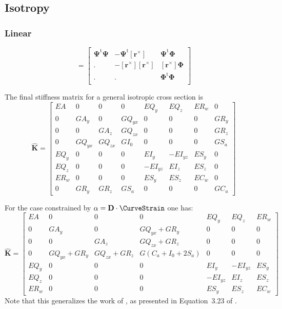 \subsection{Isotropy}
\subsubsection{Linear}

\begin{equation*}
=\begin{bmatrix}
\bm{\Psi}^{\mathrm{t}}\bm{\Psi} & -\bm{\Psi}^{\mathrm{t}}[\bm{r}^\times] & \bm{\Psi}^{\mathrm{t}}\bm{\Phi} \\
. & -\left[\bm{r}^{\times}\right][\bm{r}^\times] & \left[\bm{r}^{\times}\right]\bm{\Phi} \\
. & . & \bm{\Phi}^{\mathrm{t}}\bm{\Phi} \\
\end{bmatrix} 
\end{equation*}

The final stiffness matrix for a general isotropic cross section is
\begin{equation}
\hat{\mathbf{K}} = \left[\begin{array}{ccc|ccc|cc}
E A & 0 & 0 & 0 & E Q_{y} & E Q_{z} & E R_{w} & 0\\
0 & G A_{y} & 0 & G Q_{yx} & 0 & 0 & 0 & G R_{y}\\
0 & 0 & G A_{z} & G Q_{zx} & 0 & 0 & 0 & G R_{z}\\ \hline
0 & G Q_{yx} & G Q_{zx} & G I_{0} & 0 & 0 & 0 & G S_{a} \\
E Q_{y} & 0 & 0 & 0 & E I_{y} & - E I_{yz} & E S_{y} & 0 \\
E Q_{z} & 0 & 0 & 0 & - E I_{yz} & E I_{z} & E S_{z} & 0 \\ \hline
E R_{w} & 0 & 0 & 0 & E S_{y} & E S_{z} & E C_{w} & 0 \\
0 & G R_{y} & G R_{z} & G S_{a} & 0 & 0 & 0 & G C_{a}
\end{array}\right]
\end{equation}

For the case constrained by \(\alpha = \mathbf{D}\cdot \CurveStrain\) one has:
\begin{equation*}
\hat{\mathbf{K}} = \left[\begin{array}{ccc|ccc|c}
E A & 0 & 0 & 0 & E Q_{y} & E Q_{z} & E R_{w}\\
0 & G A_{y} & 0 & G Q_{yx} + G R_{y} & 0 & 0 & 0\\
0 & 0 & G A_{z} & G Q_{zx} + G R_{z} & 0 & 0 & 0\\ \hline
0 & G Q_{yx} + G R_{y} & G Q_{zx} + G R_{z} & G (C_{a} + I_{0} + 2 S_{a}) & 0 & 0 & 0\\
E Q_{y} & 0 & 0 & 0 & E I_{y} & - E I_{yz} & E S_{y}\\
E Q_{z} & 0 & 0 & 0 & - E I_{yz} & E I_{z} & E S_{z}\\ \hline
E R_{w} & 0 & 0 & 0 & E S_{y} & E S_{z} & E C_{w}
\end{array}\right]
\end{equation*}
Note that this generalizes the work of \cite{saritas2006mixed}, as presented in Equation~3.23 of \cite{dire20173d}.

